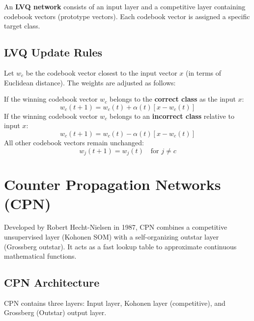 \documentclass[12pt,a4paper]{article}
\begin{document}
\begin{tcolorbox}[defbox, title={LVQ Architecture}]
An \textbf{LVQ network} consists of an input layer and a competitive layer containing codebook vectors (prototype vectors). Each codebook vector is assigned a specific target class.
\end{tcolorbox}

\subsection{LVQ Update Rules}
Let $w_c$ be the codebook vector closest to the input vector $x$ (in terms of Euclidean distance). The weights are adjusted as follows:
\par\noindent
\begin{tcolorbox}[formulabox, title={LVQ Supervised Training updates}]
If the winning codebook vector $w_c$ belongs to the \textbf{correct class} as the input $x$:
\begin{equation}
  w_c(t+1) = w_c(t) + \alpha(t) [x - w_c(t)]
\end{equation}
If the winning codebook vector $w_c$ belongs to an \textbf{incorrect class} relative to input $x$:
\begin{equation}
  w_c(t+1) = w_c(t) - \alpha(t) [x - w_c(t)]
\end{equation}
All other codebook vectors remain unchanged:
\begin{equation}
  w_j(t+1) = w_j(t) \quad \text{for } j \neq c
\end{equation}
\end{tcolorbox}

\section{Counter Propagation Networks (CPN)}

Developed by Robert Hecht-Nielsen in 1987, CPN combines a competitive unsupervised layer (Kohonen SOM) with a self-organizing outstar layer (Grossberg outstar). It acts as a fast lookup table to approximate continuous mathematical functions.

\subsection{CPN Architecture}
CPN contains three layers: Input layer, Kohonen layer (competitive), and Grossberg (Outstar) output layer.
\end{document}
